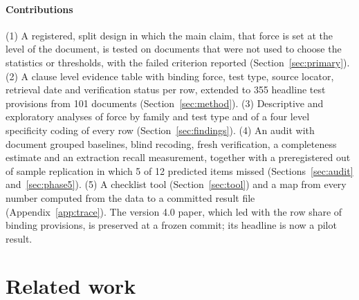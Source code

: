 \documentclass[conference]{IEEEtran}
\begin{document}
\paragraph{Contributions} (1) A registered, split design in which the main claim, that force is set at the level of the document, is tested on documents that were not used to choose the statistics or thresholds, with the failed criterion reported (Section~\ref{sec:primary}). (2) A clause level evidence table with binding force, test type, source locator, retrieval date and verification status per row, extended to 355 headline test provisions from 101 documents (Section~\ref{sec:method}). (3) Descriptive and exploratory analyses of force by family and test type and of a four level specificity coding of every row (Section~\ref{sec:findings}). (4) An audit with document grouped baselines, blind recoding, fresh verification, a completeness estimate and an extraction recall measurement, together with a preregistered out of sample replication in which 5 of 12 predicted items missed (Sections~\ref{sec:audit} and~\ref{sec:phase5}). (5) A checklist tool (Section~\ref{sec:tool}) and a map from every number computed from the data to a committed result file (Appendix~\ref{app:trace}). The version 4.0 paper, which led with the row share of binding provisions, is preserved at a frozen commit; its headline is now a pilot result.

\section{Related work}
\end{document}
